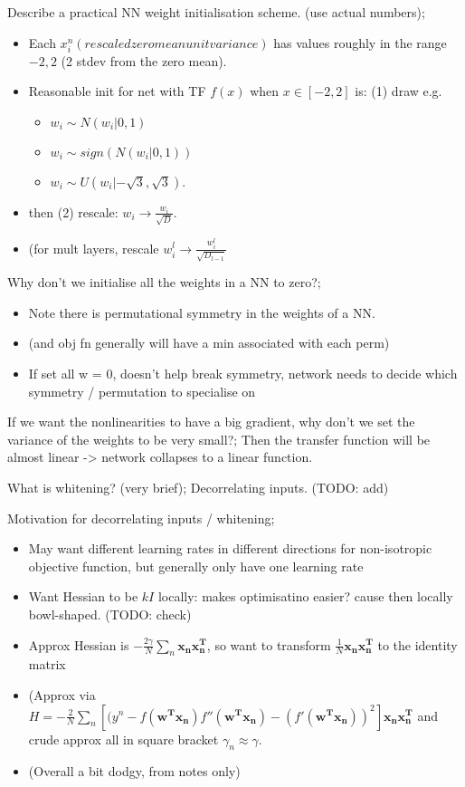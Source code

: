 \documentclass{article}
\begin{document}
Describe a practical NN weight initialisation scheme. (use actual numbers); \begin{itemize} \item Each $x^n_i (rescaled zero mean unit variance)$ has values roughly in the range $-2, 2$ (2 stdev from the zero mean). \item Reasonable init for net with TF $f(x)$ when $x\in [-2,2]$ is: (1) draw e.g. \begin{itemize}      \item $w_i \sim N(w_i|0,1)$ \item $w_i \sim sign(N(w_i|0,1))$ \item $w_i \sim U(w_i|-\sqrt{3}, \sqrt{3})$. \end{itemize} \item then (2) rescale: $w_i \rightarrow \frac{w_i}{\sqrt{D}}$. \item (for mult layers, rescale $w^l_i \rightarrow \frac{w^l_i}{\sqrt{D_{l-1}}}$ \end{itemize}

Why don't we initialise all the weights in a NN to zero?; \begin{itemize} \item Note there is permutational symmetry in the weights of a NN. \item (and obj fn generally will have a min associated with each perm) \item If set all w = 0, doesn't help break symmetry, network needs to decide which symmetry / permutation to specialise on \end{itemize}

If we want the nonlinearities to have a big gradient, why don't we set the variance of the weights to be very small?; Then the transfer function will be almost linear -> network collapses to a linear function.

What is whitening? (very brief); Decorrelating inputs. (TODO: add)

Motivation for decorrelating inputs / whitening; \begin{itemize} \item May want different learning rates in different directions for non-isotropic objective function, but generally only have one learning rate \item Want Hessian to be $kI$ locally: makes optimisatino easier? cause then locally bowl-shaped. (TODO: check) \item Approx Hessian is $-\frac{2\gamma}{N}\sum_n \mathbf{x_nx_n^T}$, so want to transform $\frac{1}{N}\mathbf{x_nx_n^T}$ to the identity matrix \item (Approx via $H=-\frac{2}{N}\sum_n[(y^n - f(\mathbf{w^Tx_n})f''(\mathbf{w^Tx_n}) - (f'(\mathbf{w^Tx_n}))^2]\mathbf{x_nx_n^T}$ and crude approx all in square bracket $\gamma_n \approx \gamma$. \item (Overall a bit dodgy, from notes only) \end{itemize}
\end{document}
